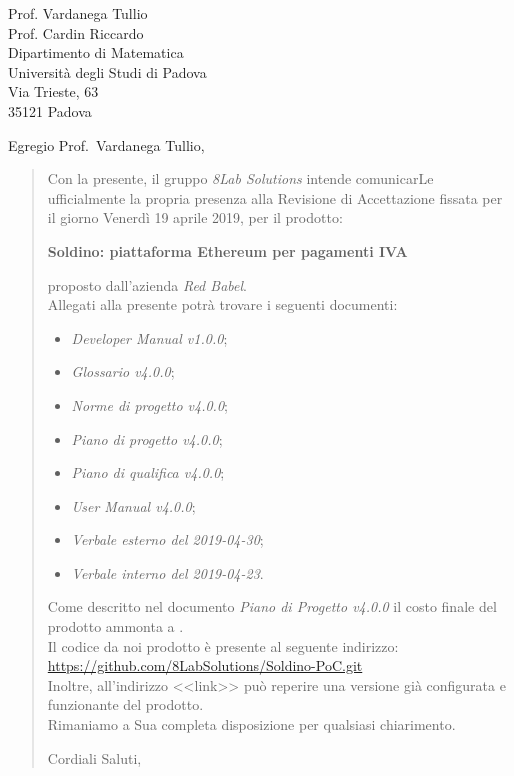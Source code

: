 
\begin{letter}{
		Prof. Vardanega Tullio \\
		Prof. Cardin Riccardo \\
		Dipartimento di Matematica \\
		Università degli Studi di Padova \\
		Via Trieste, 63 \\
		35121 Padova}
		
\opening{Egregio Prof.~Vardanega Tullio,}

\begin{quotation}
Con la presente, il gruppo \textit{8Lab Solutions} intende 
comunicarLe ufficialmente la propria presenza alla Revisione di 
Accettazione fissata per il giorno Venerdì 19 aprile 2019, per il prodotto:

\begin{center}
	\textbf{Soldino: piattaforma Ethereum per pagamenti IVA}
\end{center}

\noindent proposto dall'azienda \textit{Red Babel}. \\
Allegati alla presente potrà trovare i seguenti documenti:

\begin{itemize}
	
	\item \textit{Developer Manual v1.0.0};
	
	\item \textit{Glossario v4.0.0};
	
	\item \textit{Norme di progetto v4.0.0};

	\item \textit{Piano di progetto v4.0.0};

	\item \textit{Piano di qualifica v4.0.0};
	
	\item \textit{User Manual v4.0.0};
	
	
	\item \textit{Verbale esterno del 2019-04-30};
	\item \textit{Verbale interno del 2019-04-23}.
\end{itemize}
	


\noindent Come descritto nel documento \textit{Piano di Progetto v4.0.0} il 
costo finale del prodotto ammonta a \textbf{}.\\

\noindent Il codice da noi prodotto è presente al seguente indirizzo:\\
\url{https://github.com/8LabSolutions/Soldino-PoC.git}\\
Inoltre, all'indirizzo <<link>> può reperire una
versione già configurata e funzionante del prodotto.\\
Rimaniamo a Sua completa disposizione per qualsiasi chiarimento.

\vspace{0.5cm}
\noindent Cordiali Saluti,
\closing{}	

\end{quotation}
		
\end{letter}


